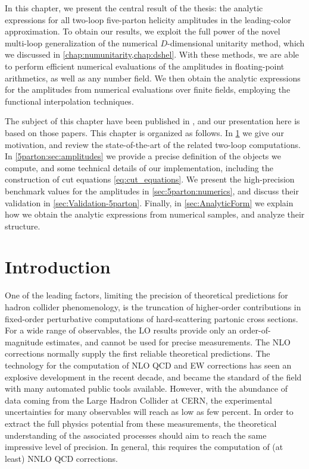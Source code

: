 In this chapter, we present the central result of the thesis:
the analytic expressions for all two-loop five-parton helicity amplitudes in the leading-color approximation.
To obtain our results, we exploit the full power of the novel multi-loop generalization of the numerical $D$-dimensional unitarity method,
which we discussed in \cref{chap:numunitarity,chap:dshel}.
With these methods, we are able to perform efficient numerical evaluations of the amplitudes in floating-point arithmetics, as well as any number field.
We then obtain the analytic expressions for the amplitudes from numerical evaluations over finite fields,
employing the functional interpolation techniques.

The subject of this chapter have been published in \cite{Abreu:2018jgq,Abreu:2019odu},
and our presentation here is based on those papers.
This chapter is organized as follows.
In \cref{5parton:sec:intro} we give our motivation, and review the state-of-the-art of the related two-loop computations.
In \cref{5parton:sec:amplitudes} we provide a precise definition  of the objects we compute,
and some technical details of our implementation, including the construction of cut equations \eqref{eq:cut_equations}.
We present the high-precision benchmark values for the amplitudes in \cref{sec:5parton:numerics},
and discuss their validation in \cref{sec:Validation-5parton}.
Finally, in \cref{sec:AnalyticForm} we explain how we obtain the analytic expressions from numerical samples,
and analyze their structure.

\section{Introduction}
\label{5parton:sec:intro}

One of the leading factors, limiting the precision of theoretical predictions for hadron collider phenomenology,
is the truncation of higher-order contributions in fixed-order perturbative computations of hard-scattering partonic cross sections.
For a wide range of observables, the LO results provide only an order-of-magnitude estimates,
and cannot be used for precise measurements.
The NLO corrections normally supply the first reliable theoretical predictions.
The technology for the computation of NLO QCD and EW corrections has seen an explosive development
in the recent decade, and became the standard of the field with many automated public tools available.
However, with the abundance of data coming from the Large Hadron Collider at CERN,
the experimental uncertainties for many observables will reach as low as few percent.
In order to extract the full physics potential from these measurements, 
the theoretical understanding of the associated processes should aim to reach the same impressive level of precision.
In general, this requires the computation of (at least) NNLO QCD corrections.

